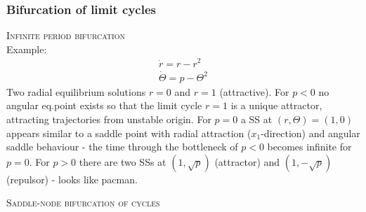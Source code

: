 \subsubsection{Bifurcation of limit cycles}
\textsc{Infinite period bifurcation}\\
Example:
\begin{align*}
\dot{r}=r-r^2\\
\dot{\Theta}=p-\Theta^2
\end{align*}
Two radial equilibrium solutions $r=0$ and $r=1$ (attractive). For $p<0$ no angular eq.point exists so that the limit cycle $r=1$ is a unique attractor, attracting trajectories from unstable origin. For $p=0$ a SS at $(r,\Theta)=(1,0)$ appears similar to a saddle point with radial attraction ($x_1$-direction) and angular saddle behaviour - the time through the bottleneck of $p<0$ becomes infinite for $p=0$. For $p>0$ there are two SSs at $(1,\sqrt{p})$ (attractor) and $(1,-\sqrt{p})$ (repulsor) - looks like pacman.
\begin{center}
\end{center}

\textsc{Saddle-node bifurcation of cycles}\\
